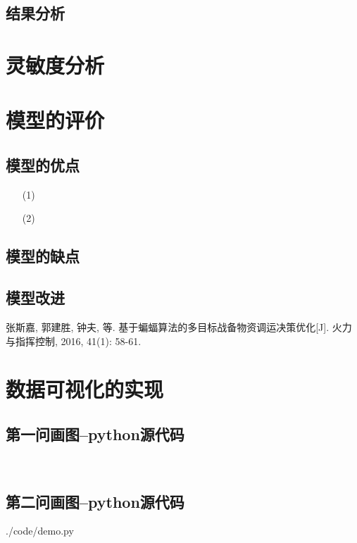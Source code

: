 \documentclass{whutmod}
\begin{document}
    	
  		\subsection{结果分析}
  
  	\section{灵敏度分析}
 
  	\section{模型的评价}
		\subsection{模型的优点}
			\begin{itemize}                                             
			\item [(1)]
			\item [(2)] 	
			\end{itemize}
		\subsection{模型的缺点}

  		\subsection{模型改进}

  
  
 
	\newpage	%
	\nocite{*}		%
	\begin{thebibliography}{9}%
		张斯嘉, 郭建胜, 钟夫, 等. 基于蝙蝠算法的多目标战备物资调运决策优化[J]. 火力与指挥控制, 2016, 41(1): 58-61.
	
	\end{thebibliography}

	\newpage
	\appendix %
	\section{数据可视化的实现}
		\subsection*{第一问画图--python源代码}
			\begin{lstlisting}[language=python]
			
			\end{lstlisting}
			
		\subsection*{第二问画图--python源代码}
			 {./code/demo.py}
\end{document}
